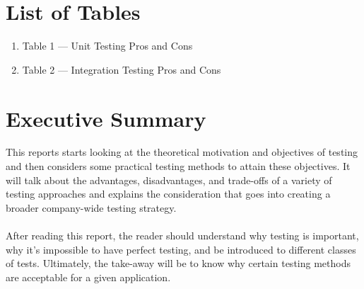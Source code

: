 \documentclass[12pt]{report}
\begin{document}
\section*{List of Tables}
\normalsize{}
\begin{enumerate}[label*={},leftmargin=*,labelsep=2ex,ref=\arabic*]
    \item Table 1 --- Unit Testing Pros and Cons 
    \item Table 2 --- Integration Testing Pros and Cons 

\end{enumerate}



\newpage\thispagestyle{fancy}\sectionfont{\scshape}
\section*{Executive Summary}

This reports starts looking at the theoretical motivation and objectives of testing and then considers some practical testing methods to attain these objectives. It will talk about the advantages, disadvantages, and trade-offs of a variety of testing approaches and explains the consideration that goes into creating a broader company-wide testing strategy.
\\ \\ \noindent 
After reading this report, the reader should understand why testing is important, why it's impossible to have perfect testing, and be introduced to different classes of tests. Ultimately, the take-away will be to know why certain testing methods are acceptable for a given application.



\newpage\thispagestyle{fancy}\sectionfont{\scshape}

\setcounter{page}{1}
\fancyfoot[C]{\thepage}
\end{document}
